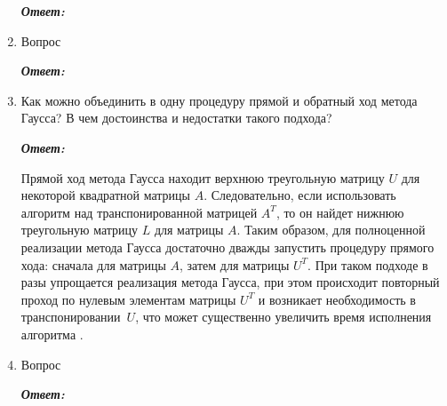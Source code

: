 \documentclass[12pt, a4paper]{article}
\begin{document}
\begin{enumerate}
		\textit{\textbf{Ответ:}}
		
		\item Вопрос
		
		\textit{\textbf{Ответ:}}
		
		\item Как можно объединить в одну процедуру прямой и обратный ход метода \mbox{Гаусса}? В чем достоинства и недостатки такого подхода?
		
		\textit{\textbf{Ответ:}}
		
		 Прямой ход метода \mbox{Гаусса} находит верхнюю треугольную матрицу $U$ для некоторой квадратной матрицы $A$. Следовательно, если использовать алгоритм над транспонированной матрицей $A^T$, то он найдет нижнюю треугольную матрицу $L$ для матрицы $A$. Таким образом, для полноценной реализации метода Гаусса достаточно дважды запустить процедуру прямого хода: сначала для матрицы $A$, затем для матрицы $U^T$. При таком подходе в разы упрощается реализация метода Гаусса, при этом происходит повторный проход по нулевым элементам матрицы $U^T$ и возникает необходимость в транспонировании~$U$, что может существенно увеличить время исполнения алгоритма .  
		
		\item Вопрос
		
		\textit{\textbf{Ответ:}}
		
	\end{enumerate}
	
\end{document}
